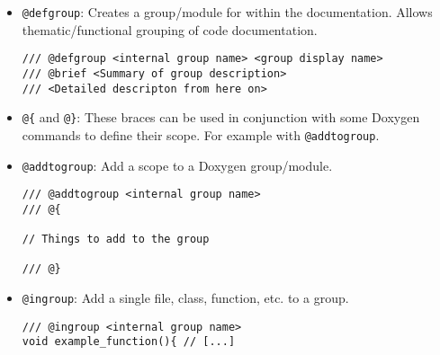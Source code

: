 \begin{itemize}
\item \texttt{@defgroup}: Creates a group/module for within the documentation. Allows thematic/functional grouping of code documentation.
\begin{lstlisting}[style=CStyle]
/// @defgroup <internal group name> <group display name> 
/// @brief <Summary of group description>
/// <Detailed descripton from here on>
\end{lstlisting}

\item \texttt{@\{} and \texttt{@\}}: These braces can be used in conjunction with some Doxygen commands to define their scope. For example with \texttt{@addtogroup}.

\item \texttt{@addtogroup}: Add a scope to a Doxygen group/module.
\begin{lstlisting}[style=CStyle]
/// @addtogroup <internal group name>
/// @{
  
// Things to add to the group

/// @}
\end{lstlisting}

\item \texttt{@ingroup}: Add a single file, class, function, etc. to a group.
\begin{lstlisting}[style=CStyle]
/// @ingroup <internal group name>
void example_function(){ // [...]
\end{lstlisting}

\end{itemize}

